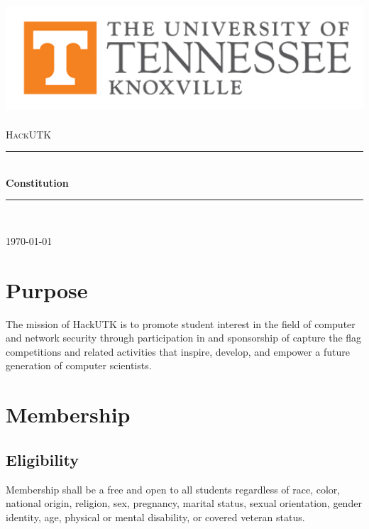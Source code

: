 \documentclass[12pt]{article}
\newcommand{\HRule}{\rule{\linewidth}{0.5mm}}
\begin{document}
\begin{titlepage}
\begin{center}

\includegraphics[width=1\textwidth]{img/utk.png}~\\[1cm]


\textsc{\Large HackUTK}\\[0.5cm]

\HRule \\[0.4cm]
{ \huge \bfseries Constitution \\[0.4cm] }

\HRule \\[1.5cm]


\vfill

{\large \today}

\end{center}
\end{titlepage}

\section{Purpose}
The mission of HackUTK is to promote student interest in the field of computer and network security through participation in and sponsorship of capture the flag competitions and related activities that inspire, develop, and empower a future generation of computer scientists.

\section{Membership}
\subsection{Eligibility}
Membership shall be a free and open to all students regardless of race, color, national origin, religion, sex, pregnancy, marital status, sexual orientation, gender identity, age, physical or mental disability, or covered veteran status.
\end{document}
